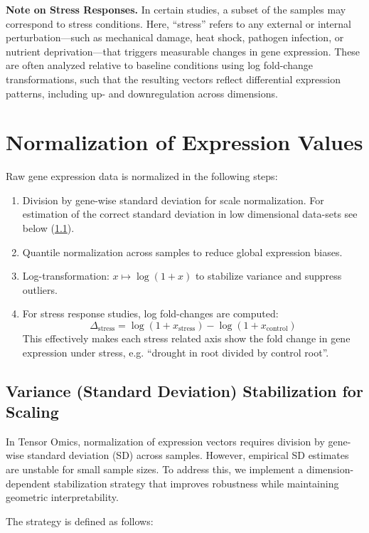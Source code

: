 \documentclass{article}
\begin{document}
\noindent\textbf{Note on Stress Responses.} In certain studies, a subset of the samples may correspond to stress conditions. Here, “stress” refers to any external or internal perturbation—such as mechanical damage, heat shock, pathogen infection, or nutrient deprivation—that triggers measurable changes in gene expression. These are often analyzed relative to baseline conditions using log fold-change transformations, such that the resulting vectors reflect differential expression patterns, including up- and downregulation across dimensions.


\section{Normalization of Expression Values}
Raw gene expression data is normalized in the following steps:
\begin{enumerate}
  \item Division by gene-wise standard deviation for scale normalization. For estimation of the correct standard deviation in low dimensional data-sets see below (\ref{loess_sd_estimation}).
    \item Quantile normalization across samples to reduce global expression biases.
    \item Log-transformation: \( x \mapsto \log(1 + x) \) to stabilize variance and suppress outliers.
    \item For stress response studies, log fold-changes are computed: 
    \[
        \Delta_{\text{stress}} = \log(1 + x_{\text{stress}}) - \log(1 + x_{\text{control}})
    \]
    This effectively makes each stress related axis show the fold change in
    gene expression under stress, e.g. ``drought in root divided by control
    root''.
\end{enumerate}

\subsection{Variance (Standard Deviation) Stabilization for Scaling}
\label{loess_sd_estimation}

In Tensor Omics, normalization of expression vectors requires division by gene-wise standard deviation (SD) across samples.
However, empirical SD estimates are unstable for small sample sizes.
To address this, we implement a dimension-dependent stabilization strategy that improves robustness while maintaining geometric interpretability.

The strategy is defined as follows:
\end{document}
